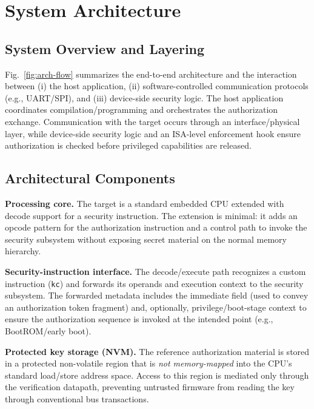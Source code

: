 
\section{System Architecture}
\label{sec:architecture}

\subsection{System Overview and Layering}
Fig.~\ref{fig:arch-flow} summarizes the end-to-end architecture and the interaction between (i) the host application, (ii) software-controlled communication protocols (e.g., UART/SPI), and (iii) device-side security logic. The host application coordinates compilation/programming and orchestrates the authorization exchange. Communication with the target occurs through an interface/physical layer, while device-side security logic and an ISA-level enforcement hook ensure authorization is checked before privileged capabilities are released.

\subsection{Architectural Components}
\label{subsec:arch-components}

\textbf{Processing core.} The target is a standard embedded CPU extended with decode support for a security instruction. The extension is minimal: it adds an opcode pattern for the authorization instruction and a control path to invoke the security subsystem without exposing secret material on the normal memory hierarchy.

\textbf{Security-instruction interface.} The decode/execute path recognizes a custom instruction (\texttt{kc}) and forwards its operands and execution context to the security subsystem. The forwarded metadata includes the immediate field (used to convey an authorization token fragment) and, optionally, privilege/boot-stage context to ensure the authorization sequence is invoked at the intended point (e.g., BootROM/early boot).

\textbf{Protected key storage (NVM).} The reference authorization material is stored in a protected non-volatile region that is \emph{not memory-mapped} into the CPU's standard load/store address space. Access to this region is mediated only through the verification datapath, preventing untrusted firmware from reading the key through conventional bus transactions.

